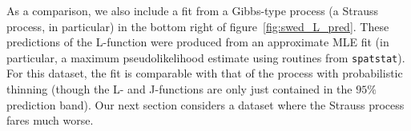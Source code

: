 \documentclass{statsoc}
\begin{document}
As a comparison, we also include a fit from a Gibbs-type process (a Strauss process, in particular) in the bottom right of 
figure~\ref{fig:swed_L_pred}. These
predictions of the L-function were produced from an approximate MLE fit (in particular, a maximum pseudolikelihood estimate
using routines from \texttt{spatstat}). For this dataset, the fit is comparable with
that of the \matern process with probabilistic thinning (though the L- and J-functions are only just contained in the $95\%$ prediction
band). Our next section considers a dataset where the Strauss process fares much worse.
\end{document}
